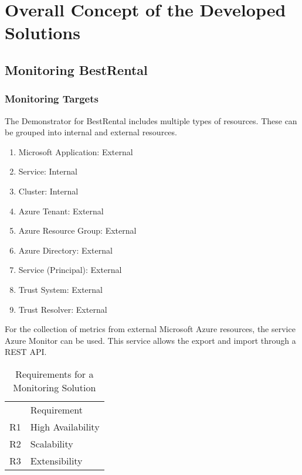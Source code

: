 \chapter{Overall Concept of the Developed Solutions}


\section{Monitoring BestRental}

\subsection{Monitoring Targets}

The Demonstrator for BestRental includes multiple types of resources.
These can be grouped into internal and external resources.
\begin{enumerate}
    \item Microsoft Application: External
    \item Service: Internal
    \item Cluster: Internal
    \item Azure Tenant: External
    \item Azure Resource Group: External
    \item Azure Directory: External
    \item Service (Principal): External
    \item Trust System: External
    \item Trust Resolver: External
\end{enumerate}

For the collection of metrics from external Microsoft Azure resources, the service Azure Monitor can be used.
This service allows the export and import through a REST API.

\begin{table}[]
\begin{tabular}{ll}
   & Requirement       \\
R1 & High Availability \\
R2 & Scalability       \\
R3 & Extensibility    
\end{tabular}
\caption{Requirements for a Monitoring Solution}
\label{tab:requirements}
\end{table}

